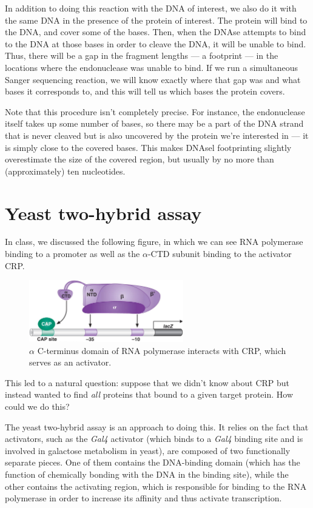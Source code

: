 \documentclass{article}
\begin{document}
In addition to doing this reaction with the DNA of interest, we also do it with the same DNA in the
presence of the protein of interest. The protein will bind to the DNA, and cover some of the bases.
Then, when the DNAse attempts to bind to the DNA at those bases in order to cleave the DNA, it will
be unable to bind. Thus, there will be a gap in the fragment lengths --- a footprint --- in the
locations where the endonuclease was unable to bind. If we run a simultaneous Sanger sequencing
reaction, we will know exactly where that gap was and what bases it corresponds to, and this will
tell us which bases the protein covers.

Note that this procedure isn't completely precise. For instance, the endonuclease itself takes up
some number of bases, so there may be a part of the DNA strand that is never cleaved but is also
uncovered by the protein we're interested in --- it is simply close to the covered bases. This makes
DNAsel footprinting slightly overestimate the size of the covered region, but usually by no more
than (approximately) ten nucleotides.

\section*{Yeast two-hybrid assay}
In class, we discussed the following figure, in which we can see RNA polymerase binding to a
promoter as well as the $\alpha$-CTD subunit binding to the activator CRP.\@

\begin{figure}[h!]
    \centering
    \includegraphics[width=0.6\textwidth]{images/cap-rnap.png}
    \caption{
        $\alpha$ C-terminus domain of RNA polymerase interacts with CRP, which serves as an
        activator.
    }
\end{figure}

This led to a natural question: suppose that we didn't know about CRP but instead wanted to find
\emph{all} proteins that bound to a given target protein. How could we do this?

The yeast two-hybrid assay is an approach to doing this. It relies on the fact that activators, such
as the \emph{Gal4} activator (which binds to a \emph{Gal4} binding site and is involved in galactose
metabolism in yeast), are composed of two functionally separate pieces. One of them contains the
DNA-binding domain (which has the function of chemically bonding with the DNA in the binding site),
while the other contains the activating region, which is responsible for binding to the RNA
polymerase in order to increase its affinity and thus activate transcription.
\end{document}
